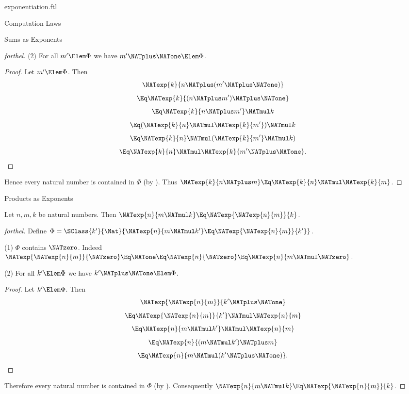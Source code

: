 \documentclass{stex}
\begin{document}
\begin{smodule}{exponentiation.ftl}
\begin{sfragment}{Computation Laws}
\begin{sfragment}{Sums as Exponents}
\begin{proof}[forthel]
      (2) For all $m' \Elem \Phi$ we have $m' \NATplus \NATone \Elem \Phi$.
      \begin{proof}
        Let $m' \Elem \Phi$.
        Then
        \[  \NATexp{k}{n \NATplus (m' \NATplus \NATone)}                  \]
        \[    \Eq \NATexp{k}{(n \NATplus m') \NATplus \NATone}              \]
        \[    \Eq \NATexp{k}{n \NATplus m'} \NATmul k            \]
        \[    \Eq (\NATexp{k}{n} \NATmul \NATexp{k}{m'}) \NATmul k  \]
        \[    \Eq \NATexp{k}{n} \NATmul (\NATexp{k}{m'} \NATmul k)  \]
        \[    \Eq \NATexp{k}{n} \NATmul \NATexp{k}{m' \NATplus \NATone}.       \]
      \end{proof}

      Hence every natural number is contained in $\Phi$ (by ).
      Thus $\NATexp{k}{n \NATplus m} \Eq \NATexp{k}{n} \NATmul \NATexp{k}{m}$.
    \end{proof}
  \end{sfragment}

  \begin{sfragment}{Products as Exponents}
    \begin{proposition}[forthel,id=ARITHMETIC_09_7827956571308032]
      Let $n, m, k$ be natural numbers.
      Then $\NATexp{n}{m \NATmul k} \Eq \NATexp{\NATexp{n}{m}}{k}$.
    \end{proposition}
    \begin{proof}[forthel]
      Define $\Phi = \SClass{k'}{\Nat}{\NATexp{n}{m \NATmul k'} \Eq \NATexp{\NATexp{n}{m}}{k'}}$.

      (1) $\Phi$ contains $\NATzero$.
      Indeed $\NATexp{\NATexp{n}{m}}{\NATzero}
        \Eq \NATone
        \Eq \NATexp{n}{\NATzero}
        \Eq \NATexp{n}{m \NATmul \NATzero}$.

      (2) For all $k' \Elem \Phi$ we have $k' \NATplus \NATone \Elem \Phi$.
      \begin{proof}
        Let $k' \Elem \Phi$.
        Then
        \[  \NATexp{\NATexp{n}{m}}{k' \NATplus \NATone}                \]
        \[    \Eq \NATexp{\NATexp{n}{m}}{k'} \NATmul \NATexp{n}{m}    \]
        \[    \Eq \NATexp{n}{m \NATmul k'} \NATmul \NATexp{n}{m}  \]
        \[    \Eq \NATexp{n}{(m \NATmul k') \NATplus m}        \]
        \[    \Eq \NATexp{n}{m \NATmul (k' \NATplus \NATone)}.       \]
      \end{proof}

      Therefore every natural number is contained in $\Phi$ (by ).
      Consequently $\NATexp{n}{m \NATmul k} \Eq \NATexp{\NATexp{n}{m}}{k}$.
    \end{proof}
  \end{sfragment}


\end{sfragment}
\end{smodule}
\end{document}
